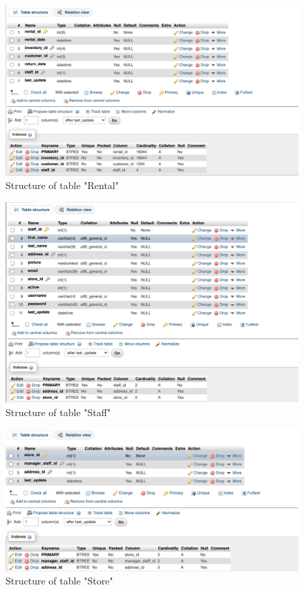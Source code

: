\documentclass{article}
\begin{document}
	\begin{figure}[H]
		\includegraphics[width=\textwidth]{table_rental_struct}
		\caption{Structure of table "Rental"}	
	\end{figure}
	\begin{figure}[H]
		\includegraphics[width=\textwidth]{table_staff_struct}
		\caption{Structure of table "Staff"}	
	\end{figure}
	\begin{figure}[H]
		\includegraphics[width=\textwidth]{table_store_struct}
		\caption{Structure of table "Store"}	
	\end{figure}
\end{document}
